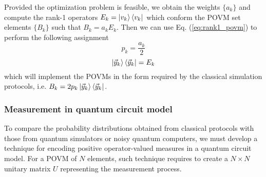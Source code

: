 Provided the optimization problem is feasible, we obtain the weights $\{a_k\}$ and compute the rank-1 operators $E_k = \ket{v_k}\bra{v_k}$ which conform the POVM set elements $\{B_k\}$ such that $B_k=a_k E_k$. Then we can use Eq. (\ref{eq:rank1_povm}) to perform the following assignment
\begin{equation}
    p_k = \frac{a_k}{2}
\end{equation}
\begin{equation}
    \ket{\vec{y}_k}\bra{\vec{y}_k} = E_k
\end{equation}
which will implement the POVMs in the form required by the classical simulation protocols, i.e. $B_{k} = 2p_{k}\ket{\vec{y}_{k}}\bra{\vec{y}_{k}}$.

\subsubsection{Measurement in quantum circuit model}\label{section:neumark}
To compare the probability distributions obtained from classical protocols with those from quantum simulators or noisy quantum computers, we must develop a technique for encoding positive operator-valued measures in a quantum circuit model. For a POVM of $N$ elements, such technique requires to create a $N\times N$ unitary matrix $U$ representing the measurement process.

